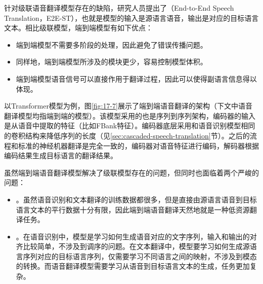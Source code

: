 \parinterval 针对级联语音翻译模型存在的缺陷，研究人员提出了{\small{}}（End-to-End Speech Translation，E2E-ST），也就是模型的输入是源语言语音，输出是对应的目标语言文本。相比级联模型，端到端模型有如下优点：

\begin{itemize}
    \vspace{0.5em}
    \item 端到端模型不需要多阶段的处理，因此避免了错误传播问题。
    \vspace{0.5em}
    \item 同样地，端到端模型所涉及的模块更少，容易控制模型体积。
    \vspace{0.5em}
    \item 端到端模型语音信号可以直接作用于翻译过程，因此可以使得副语言信息得以体现。
    \vspace{0.5em}
\end{itemize}

\parinterval 以Transformer模型为例，图\ref{fig:17-7}展示了端到端语音翻译的架构（下文中语音翻译模型均指端到端的模型）。该模型采用的也是序列到序列架构，编码器的输入是从语音中提取的特征（比如FBank特征）。编码器底层采用和语音识别模型相同的卷积结构来降低序列的长度（见\ref{sec:cascaded-speech-translation}节）。之后的流程和标准的神经机器翻译是完全一致的，编码器对语音特征进行编码，解码器根据编码结果生成目标语言的翻译结果。

\parinterval 虽然端到端语音翻译模型解决了级联模型存在的问题，但同时也面临着两个严峻的问题：

\begin{itemize}
    \vspace{0.5em}
    \item {\small{}}。虽然语音识别和文本翻译的训练数据都很多，但是直接由源语言语音到目标语言文本的平行数据十分有限，因此端到端语音翻译天然地就是一种低资源翻译任务。
    \vspace{0.5em}
    \item {\small{}}。在语音识别中，模型是学习如何生成语音对应的文字序列，输入和输出的对齐比较简单，不涉及到调序的问题。在文本翻译中，模型要学习如何生成源语言序列对应的目标语言序列，仅需要学习不同语言之间的映射，不涉及到模态的转换。而语音翻译模型需要学习从语音到目标语言文本的生成，任务更加复杂。
    \vspace{0.5em}
\end{itemize}

